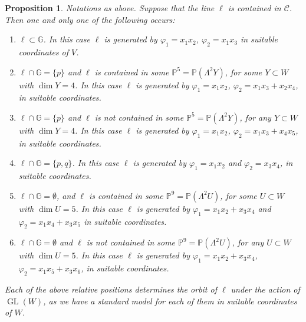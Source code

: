 \documentclass[10pt,reqno]{amsart}
\newcommand{\cC}{{\mathcal{C}}}
\newcommand{\GG}{\mathbb{G}}
\newcommand{\PP}{\mathbb P}
\newcommand{\GL}{\operatorname{GL}}
\newcommand{\f}{\varphi}
\renewcommand{\L}{\Lambda}
\newtheorem{proposition}[theorem]{Proposition}
\theoremstyle{definition}
\begin{document}
\begin{proposition}\label{prop:case62-rel-positions-l-subset-C}
Notations as above. Suppose that the line $\ell$ is contained in $\cC$. Then one and only one of the following occurs:
\begin{enumerate}
\item $\ell \subset \GG$. 
In this case $\ell$ is generated by $\f_1=x_1x_2$, $\f_2=x_1x_3$ in suitable coordinates of $V$.

\medskip

\item $\ell \cap \GG=\{p\}$ and $\ell$ is contained in some $\PP^5=\PP(\L^2 Y)$, for some $Y\subset W$ with $\dim Y=4$. In this case $\ell$ is generated by $\f_1=x_1x_2$, $\f_2=x_1x_3+x_2x_4$, in suitable coordinates.

\medskip

\item $\ell \cap \GG=\{p\}$ and $\ell$ is not contained in some $\PP^5=\PP(\L^2 Y)$, for any $Y\subset W$ with $\dim Y=4$. In this case $\ell$ is generated by $\f_1=x_1x_2$, $\f_2=x_1x_3+x_4x_5$, in suitable coordinates.

\medskip

\item $\ell \cap \GG=\{p,q\}$. In this case $\ell$ is generated by $\f_1=x_1x_2$ and $\f_2=x_3x_4$, in suitable coordinates.

\medskip

\item $\ell \cap \GG=\emptyset$, and $\ell$ is contained in some $\PP^9=\PP(\L^2 U)$, for some $U\subset W$ with $\dim U=5$. In this case $\ell$ is generated by $\f_1=x_1x_2+x_3x_4$ and $\f_2=x_1x_4+x_3x_5$ in suitable coordinates.

\medskip

\item $\ell \cap \GG=\emptyset$ and $\ell$ is not contained in some $\PP^9=\PP(\L^2 U)$, for any $U\subset W$ with $\dim U=5$. In this case $\ell$ is generated by $\f_1=x_1x_2+x_3x_4$, $\f_2=x_1x_5+x_3x_6$, in suitable coordinates.

\end{enumerate}
Each of the above relative positions determines the orbit of $\ell$ under the action of $\GL(W)$, as we have a standard model for each of them in suitable coordinates of $W$.
\end{proposition}
\end{document}
